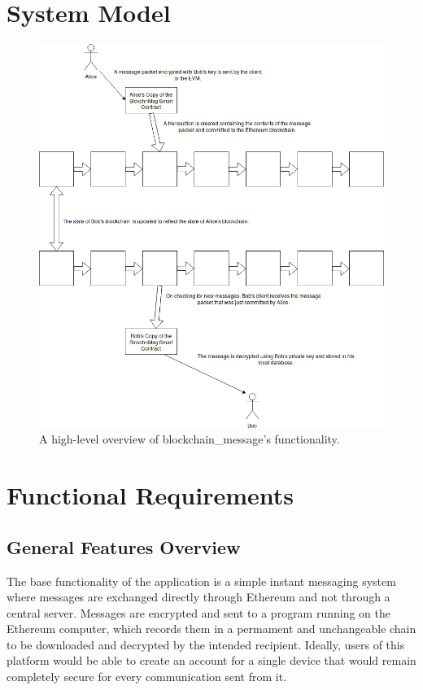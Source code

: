 \documentclass[titlepage]{report}
\begin{document}
\section{System Model}
\begin{figure}[H]
    \centering
    \includegraphics[width=1.3\textwidth]{diagram}
    \caption{A high-level overview of blockchain\_message's functionality.}
\end{figure}
\pagebreak

\section{Functional Requirements}
\subsection{General Features Overview}
The base functionality of the application is a simple instant messaging system where messages are exchanged directly through \gls{Ethereum} and not through a central server. Messages are encrypted and sent to a program running on the Ethereum computer, which records them in a permament and unchangeable chain to be downloaded and decrypted by the intended recipient. Ideally, users of this platform would be able to create an account for a single device that would remain completely secure for every communication sent from it.
\end{document}
